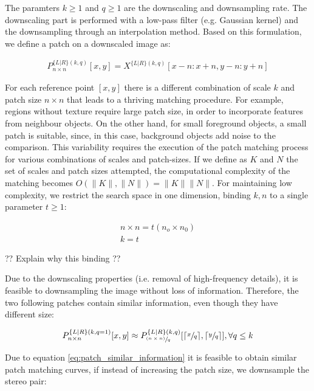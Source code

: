 \documentclass[runningheads]{llncs}
\begin{document}
The paramters $k \geq 1$ and $q \geq 1$ are the downscaling and downsampling rate. The downscaling part is performed with a low-pass filter (e.g. Gaussian kernel) and the downsampling through an interpolation method. Based on this formulation, we define a patch on a downscaled image as:

\begin{gather}
    P^{ \{L|R\} (k,q)}_{n \times n}[x,y] = X^{ \{ L|R \}(k,q)} [x-n:x+n, y-n:y+n]
\end{gather}

For each reference point $[x,y]$ there is a different combination of scale $k$ and patch size $n \times n$ that leads to a thriving matching procedure. For example, regions without texture require large patch size, in order to incorporate features from neighbour objects. On the other hand, for small foreground objects, a small patch is suitable, since, in this case, background objects add noise to the comparison. This variability requires the execution of the patch matching process for various combinations of scales and patch-sizes. If we define as $K$ and $N$ the set of scales and patch sizes attempted, the computational complexity of the matching becomes $O(\| K \|, \| N \|) = \| K \| \| N \|$. For maintaining low complexity, we restrict the search space in one dimension, binding $k, n$ to a single parameter $t\geq1$:

\begin{gather}
    n \times n = t(n_o \times n_0) \label{eq:t_param1}\\
    k = t \label{eq:t_param2}
\end{gather}

?? Explain why this binding ??

Due to the downscaling properties (i.e. removal of high-frequency details), it is feasible to downsampling the image without loss of information. Therefore, the two following patches contain similar information, even though they have different size:

\begin{gather} \label{eq:patch_similar_information}
    P^{ \{L|R\} (k,q=1)}_{n \times n}[x,y] \approx P^{ \{L|R\} (k,q)}_{\sfrac{(n \times n)}{q}}[\lceil \sfrac{x}{q} \rceil,\lceil \sfrac{y}{q} \rceil], \forall q \leq k
\end{gather}{}

Due to equation \ref{eq:patch_similar_information} it is feasible to obtain similar patch matching curves, if instead of increasing the patch size, we downsample the stereo pair:
\end{document}

